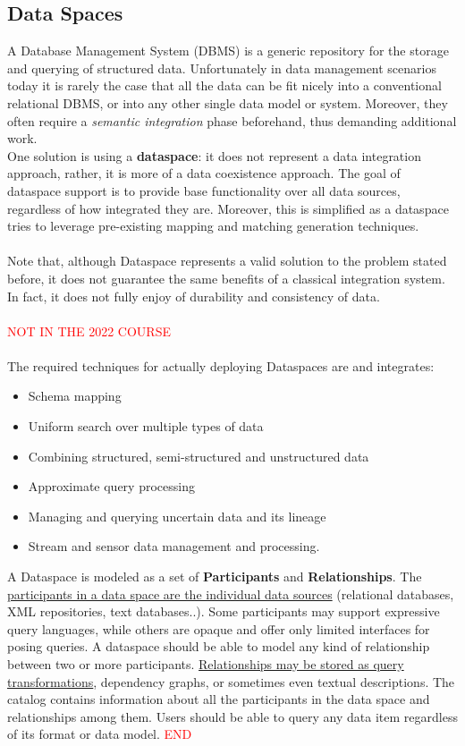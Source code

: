 \documentclass[10pt,a4paper]{article}
\newcommand{\nline}{\\~\\}
\begin{document}
\begin{justify}
\subsection{Data Spaces}
A Database Management System (DBMS) is a generic repository for the storage and querying of structured data. Unfortunately in data management scenarios today it is rarely the case that all the data can be fit nicely into a conventional relational DBMS, or into any other single data model or system. Moreover, they often require a \textit{semantic integration} phase beforehand, thus demanding additional work. \\
One solution is using a \textbf{dataspace}: it does not represent a data integration approach, rather, it is more of a data coexistence approach. The goal of dataspace support is to provide base functionality over all data sources, regardless of how integrated they are. Moreover, this is simplified as a dataspace tries to leverage pre-existing mapping and matching generation techniques. \nline
Note that, although Dataspace represents a valid solution to the problem stated before, it does not guarantee the same benefits of a classical integration system. In fact, it does not fully enjoy of durability and consistency of data. \nline
\textcolor{red}{NOT IN THE 2022 COURSE} \nline
The required techniques for actually deploying Dataspaces are and integrates:
\begin{itemize}
	\item Schema mapping
	\item Uniform search over multiple types of data
	\item Combining structured, semi-structured and unstructured data
	\item Approximate query processing
	\item Managing and querying uncertain data and its lineage
	\item Stream and sensor data management and processing.
\end{itemize}
A Dataspace is modeled as a set of \textbf{Participants} and \textbf{Relationships}. The \uline{participants in a data space are the individual data sources} (relational databases, XML repositories, text databases..). Some participants may support expressive query languages, while others are opaque and offer only limited interfaces for posing queries. A dataspace should be able to model any kind of relationship between two or more participants. \uline{Relationships may be stored as query transformations}, dependency graphs, or sometimes even textual descriptions. The catalog contains information about all the participants in the data space and relationships among them.
Users should be able to query any data item regardless of its format or data model.
\textcolor{red}{END}

\end{justify}
\end{document}
